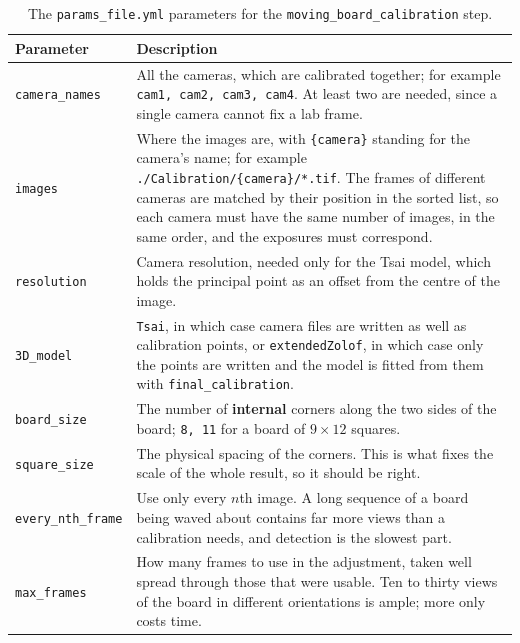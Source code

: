\documentclass[10pt,a4paper]{article}
\begin{document}
\begin{table}
	\centering
	\caption{The \texttt{params\_file.yml} parameters for the \texttt{moving\_board\_calibration} step. \label{tab:moving_paramsfile}}
	\begin{tabular}{l m{10cm}}
		\hline
		Parameter & Description\\[.2cm]
		\hline

		\texttt{camera\_names} & All the cameras, which are calibrated together; for example \texttt{cam1, cam2, cam3, cam4}. At least two are needed, since a single camera cannot fix a lab frame. \\[.2cm]

		\texttt{images} & Where the images are, with \texttt{\{camera\}} standing for the camera's name; for example \texttt{./Calibration/\{camera\}/*.tif}. The frames of different cameras are matched by their position in the sorted list, so each camera must have the same number of images, in the same order, and the exposures must correspond. \\[.2cm]

		\texttt{resolution} & Camera resolution, needed only for the Tsai model, which holds the principal point as an offset from the centre of the image. \\[.2cm]

		\texttt{3D\_model} & \texttt{Tsai}, in which case camera files are written as well as calibration points, or \texttt{extendedZolof}, in which case only the points are written and the model is fitted from them with \texttt{final\_calibration}. \\[.2cm]

		\texttt{board\_size} & The number of \textbf{internal} corners along the two sides of the board; \texttt{8, 11} for a board of $9 \times 12$ squares. \\[.2cm]

		\texttt{square\_size} & The physical spacing of the corners. This is what fixes the scale of the whole result, so it should be right. \\[.2cm]

		\texttt{every\_nth\_frame} & Use only every $n$th image. A long sequence of a board being waved about contains far more views than a calibration needs, and detection is the slowest part. \\[.2cm]

		\texttt{max\_frames} & How many frames to use in the adjustment, taken well spread through those that were usable. Ten to thirty views of the board in different orientations is ample; more only costs time. \\[.2cm]


\end{tabular}
\end{table}
\end{document}
